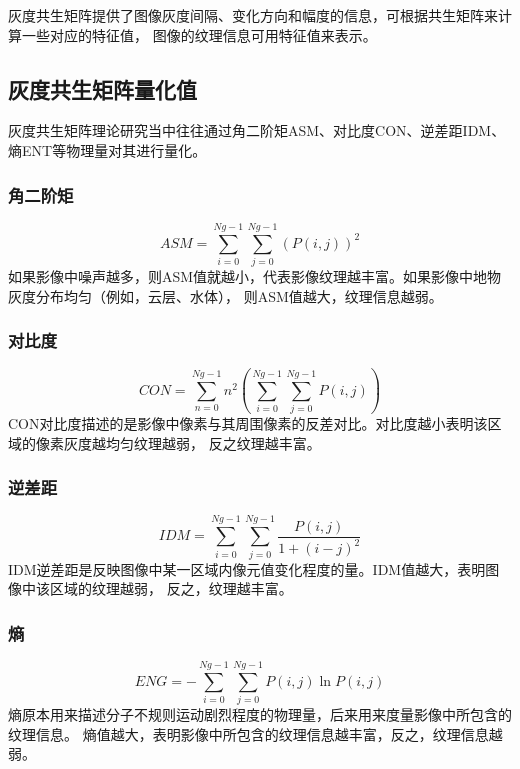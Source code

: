 灰度共生矩阵提供了图像灰度间隔、变化方向和幅度的信息，可根据共生矩阵来计算一些对应的特征值，
图像的纹理信息可用特征值来表示\cite{huidugongshengjuzhen}\cite{glcm}。

\subsection{灰度共生矩阵量化值}
灰度共生矩阵理论研究当中往往通过角二阶矩ASM、对比度CON、逆差距IDM、熵ENT等物理量对其进行量化。

\subsubsection{角二阶矩}
\begin{equation}
    ASM=\sum_{i=0}^{N g-1} \sum_{j=0}^{N g-1}(P(i, j))^{2}
\end{equation}
如果影像中噪声越多，则ASM值就越小，代表影像纹理越丰富。如果影像中地物灰度分布均匀（例如，云层、水体），
则ASM值越大，纹理信息越弱。

\subsubsection{对比度}
\begin{equation}
    CON=\sum_{n=0}^{N g-1} n^{2}(\sum_{i=0}^{N g-1} \sum_{j=0}^{N g-1} P(i, j))
\end{equation}
CON对比度描述的是影像中像素与其周围像素的反差对比。对比度越小表明该区域的像素灰度越均匀纹理越弱，
反之纹理越丰富。

\subsubsection{逆差距}
\begin{equation}
    IDM=\sum_{i=0}^{N g-1} \sum_{j=0}^{N g-1} \frac{P(i, j)}{1+(i-j)^{2}}
\end{equation}
IDM逆差距是反映图像中某一区域内像元值变化程度的量。IDM值越大，表明图像中该区域的纹理越弱，
反之，纹理越丰富。

\subsubsection{熵}
\begin{equation}
    ENG=-\sum_{i=0}^{N g-1} \sum_{j=0}^{N g-1} P(i, j) \ln P(i, j)
\end{equation}
熵原本用来描述分子不规则运动剧烈程度的物理量，后来用来度量影像中所包含的纹理信息。
熵值越大，表明影像中所包含的纹理信息越丰富，反之，纹理信息越弱。






